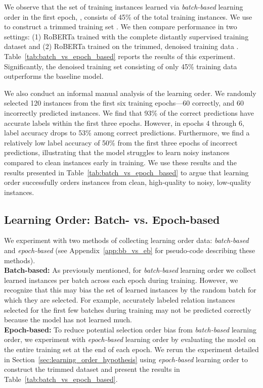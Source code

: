 We observe that the set of training instances learned via \textit{batch-based} learning order in the first epoch, , consists of 45\% of the total training instances. We use  to construct a trimmed training set . We then compare performance in two settings: (1) RoBERTa trained with the complete distantly supervised training dataset  and (2) RoBERTa trained on the trimmed, denoised training data . Table~\ref{tab:batch_vs_epoch_based} reports the results of this experiment. Significantly, the denoised training set consisting of only 45\% training data outperforms the baseline model. 

We also conduct an informal manual analysis of the learning order. We randomly selected 120 instances from the first six training epochs---60 correctly, and 60 incorrectly predicted instances. We find that 93\% of the correct predictions have accurate labels within the first three epochs. However, in epochs 4 through 6, label accuracy drops to 53\% among correct predictions. Furthermore, we find a relatively low label accuracy of 50\% from the first three epochs of incorrect predictions, illustrating that the model struggles to learn noisy instances compared to clean instances early in training. We use these results and the results presented in Table~\ref{tab:batch_vs_epoch_based} to argue that learning order successfully orders instances from clean, high-quality to noisy, low-quality instances. 



\subsection{Learning Order: Batch- vs. Epoch-based}
We experiment with two methods of collecting learning order data: \textit{batch-based} and \textit{epoch-based} (see Appendix~\ref{app:bb_vs_eb} for pseudo-code describing these methods). \\
\textbf{Batch-based:} As previously mentioned, for \textit{batch-based} learning order we collect learned instances per batch across each epoch during training. However, we recognize that this may bias the set of learned instances by the random batch for which they are selected. For example, accurately labeled relation instances selected for the first few batches during training may not be predicted correctly because the model has not learned much. \\
\textbf{Epoch-based:} To reduce potential selection order bias from \textit{batch-based} learning order, we experiment with \textit{epoch-based} learning order 
by evaluating the model on the entire training set at the end of each epoch. We rerun the experiment detailed in Section~\ref{sec:learning_order_hypothesis} using \textit{epoch-based} learning order to construct the trimmed dataset  and present the results in Table~\ref{tab:batch_vs_epoch_based}.


